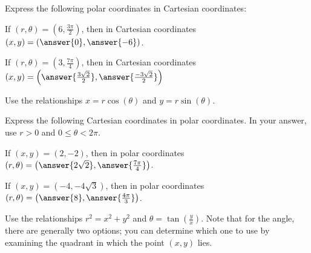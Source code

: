 \documentclass{ximera}
\author{Jim Talamo and Jason Miller}
\begin{document}
\begin{exercise}

Express the following polar coordinates in Cartesian coordinates: 

If $\left(r,\theta\right) = \left( 6, \frac{3\pi}{2}\right)$, then in Cartesian coordinates $(x,y) = \left( \answer{0}, \answer{-6 }\right)$.

If $\left(r,\theta\right) = \left(3, \frac{7 \pi}{4}\right)$, then in Cartesian coordinates $(x,y) = \left( \answer{\frac{3\sqrt{2}}{2}}, \answer{\frac{-3\sqrt{2}}{2}} \right)$

\begin{hint}
Use the relationships $x=r\cos(\theta)$ and $y=r\sin(\theta)$.
\end{hint}

\end{exercise}

\begin{exercise}

Express the following Cartesian coordinates in polar coordinates.  In your answer, use $r>0$ and $0 \leq \theta < 2\pi$. 


If $(x,y) =\left(2, -2 \right)$, then in polar coordinates $(r,\theta) =\left( \answer{ 2\sqrt{2}}, \answer{ \frac{7\pi}{4 } } \right)$. 

If $(x,y) =\left(-4, -4\sqrt{3} \right)$, then in polar coordinates $(r,\theta) =\left( \answer{ 8 } , \answer{  \frac{4\pi}{3}  } \right)$. 

\begin{hint}
Use the relationships $r^2=x^2+y^2$ and $\theta = \tan\left(\frac{y}{x}\right)$.  Note that for the angle, there are generally two options; you can determine which one to use by examining the quadrant in which the point $(x,y)$ lies.

\end{hint}
\end{exercise}
\end{document}
